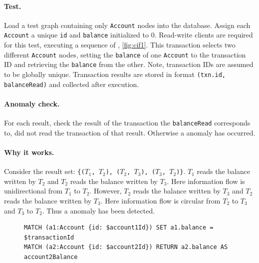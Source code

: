 \paragraph{Test.}
Load a test graph containing only \texttt{Account} nodes into the database.
Assign each \texttt{Account} a unique \texttt{id} and \texttt{balance} 
initialized to 0. Read-write clients are required for this test, executing a 
sequence of , \autoref{fig:cif1}. This transaction 
selects two different \texttt{Account} nodes, setting the \texttt{balance} of 
one \texttt{Account} to the transaction ID and retrieving the \texttt{balance} 
from the other. Note, transaction IDs are assumed to be globally unique. 
Transaction results are stored in format \texttt{(txn.id, balanceRead)} and 
collected after execution.

\paragraph{Anomaly check.}
For each result, check the result of the transaction the \texttt{balanceRead} 
corresponds to, did not read the transaction of that result. Otherwise a 
 anomaly has occurred.

\paragraph{Why it works.}
Consider the result set:
\texttt{\{($T_\mathrm{1}$, $T_\mathrm{2}$), ($T_\mathrm{2}$, $T_\mathrm{3}$), 
($T_\mathrm{3}$, $T_\mathrm{2}$)\}}. $T_\mathrm{1}$ reads the balance written by
$T_\mathrm{2}$ and $T_\mathrm{2}$ reads the balance written by $T_\mathrm{3}$.
Here information flow is unidirectional from $T_\mathrm{1}$ to $T_\mathrm{2}$.
However, $T_\mathrm{2}$ reads the balance written by $T_\mathrm{3}$ and 
$T_\mathrm{2}$ reads the balance written by $T_\mathrm{3}$. Here information flow 
is circular from $T_\mathrm{2}$ to $T_\mathrm{3}$ and $T_\mathrm{3}$ to $T_\mathrm{2}$.
Thus a  anomaly has been detected.

\begin{figure}[htb]
\begin{lstlisting}[language=cypher,label=fig:cif1,caption=\tx{G1c $T_\mathrm{RW}$}.]
MATCH (a1:Account {id: $account1Id}) SET a1.balance = $transactionId
MATCH (a2:Account {id: $account2Id}) RETURN a2.balance AS account2Balance
\end{lstlisting}
\end{figure}

